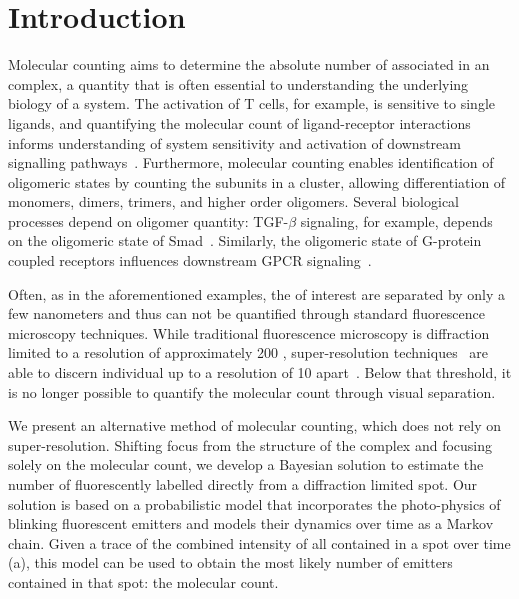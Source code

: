 \section{Introduction}



%
Molecular counting aims to determine the absolute number of \smallobjects
associated in an complex, a quantity that is often essential to understanding
the underlying biology of a system.
  The activation of T cells, for example, is sensitive to single ligands, and
  quantifying the molecular count of ligand-receptor interactions informs
  understanding of system sensitivity and activation of downstream signalling 
  pathways~\citep{irvine_2002}.
  Furthermore, molecular counting enables identification of oligomeric states by
  counting the subunits in a cluster, allowing differentiation of monomers, dimers,
  trimers, and higher order oligomers.
  Several biological processes depend on oligomer quantity: TGF-$\beta$ signaling,
  for example, depends on the oligomeric state of Smad~\citep{inman_2002,
  moustakas_2002}.
  Similarly, the oligomeric state of G-protein coupled receptors influences
  downstream GPCR signaling~\citep{felce_2018, breitwieser_2004}.

%
Often, as in the aforementioned examples, the \smallobjects of interest are separated by only a few
nanometers and thus can not be quantified through standard fluorescence
microscopy techniques.
  While traditional fluorescence microscopy is diffraction limited to a resolution 
  of approximately 200 \nanometer, super-resolution 
  techniques~\citep{betzig_2006,rust_2006,rittweger_sted_2009} 
  are able to discern individual \smallobjects up to a resolution of 10 \nanometer 
  apart~\citep{valli_seeing_2021}.
  Below that threshold, it is no longer possible to quantify the molecular count 
  through visual separation.

%
We present an alternative method of molecular counting, which does not rely on super-resolution.
%
  Shifting focus from the structure of the complex and focusing solely on the molecular count, 
  we develop a Bayesian solution to estimate the number of
  fluorescently labelled \smallobjects directly from a diffraction limited
  spot.
  Our solution is based on a probabilistic model that incorporates the
  photo-physics of blinking fluorescent emitters and models their dynamics over
  time as a Markov chain.
  Given a trace of the combined intensity of all \smallobjects contained in a
  spot over time (a), this model can be used to obtain the 
  most likely number of emitters contained in that spot: the molecular count.

